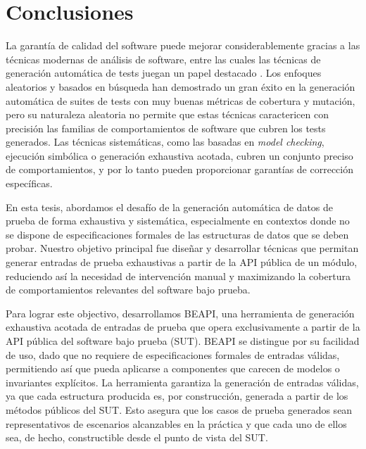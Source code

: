 \chapter{Conclusiones}
\label{cap:conclutions}

La garantía de calidad del software puede mejorar considerablemente gracias a las técnicas modernas de análisis de software, 
entre las cuales las técnicas de generación automática de tests juegan un papel destacado \cite{Cadar08, Luckow14, Fraser11, Pacheco07, Ma15, goGodefroid05, Marinov01, Boyapati02,Godefroid12}. 
Los enfoques aleatorios y basados en búsqueda han demostrado un gran éxito en la generación automática de suites de tests con muy buenas métricas de cobertura y mutación, 
pero su naturaleza aleatoria no permite que estas técnicas caractericen con precisión las familias de comportamientos de software 
que cubren los tests generados. Las técnicas sistemáticas, como las basadas en \emph{model checking}, ejecución simbólica 
o generación exhaustiva acotada, cubren un conjunto preciso de comportamientos, y por lo tanto pueden proporcionar garantías de corrección específicas.

En esta tesis, abordamos el desafío de la generación automática de datos de prueba de forma exhaustiva y sistemática, 
especialmente en contextos donde no se dispone de especificaciones formales de las estructuras de datos que se deben probar. 
Nuestro objetivo principal fue diseñar y desarrollar técnicas que permitan generar entradas de prueba exhaustivas a partir de la API pública de un módulo, reduciendo 
así la necesidad de intervención manual y maximizando la cobertura de comportamientos relevantes del software bajo prueba.

Para lograr este objectivo, desarrollamos BEAPI, una herramienta de generación exhaustiva acotada de entradas de prueba que opera exclusivamente a partir de la API pública del software bajo prueba (SUT). 
BEAPI se distingue por su facilidad de uso, dado que no requiere de especificaciones formales de entradas válidas, permitiendo así que pueda aplicarse a componentes que carecen de modelos o invariantes explícitos. 
La herramienta garantiza la generación de entradas válidas, ya que cada estructura producida es, por construcción, generada a partir de los métodos públicos del SUT. 
Esto asegura que los casos de prueba generados sean representativos de escenarios alcanzables en la práctica y que cada uno de ellos sea, de hecho, constructible desde el punto de vista del SUT.  

